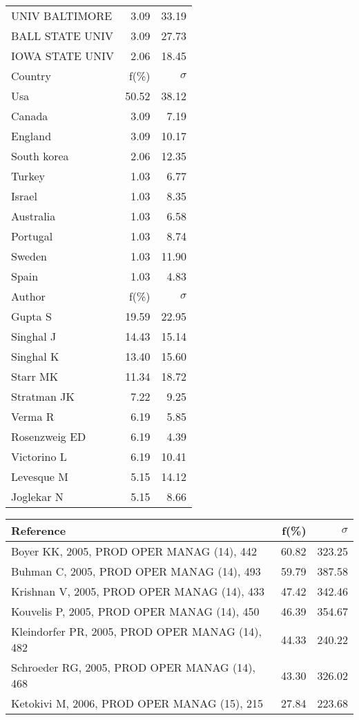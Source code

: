 \documentclass[a4paper,11pt]{report}
\begin{document}
\begin{landscape}
\begin{table}[!ht]
{\begin{tabular}{|l r r|}
UNIV BALTIMORE & 3.09 & 33.19\\
BALL STATE UNIV & 3.09 & 27.73\\
IOWA STATE UNIV & 2.06 & 18.45\\
\hline
\hline
Country & f(\%) & $\sigma$\\
\hline
Usa & 50.52 & 38.12\\
Canada & 3.09 & 7.19\\
England & 3.09 & 10.17\\
South korea & 2.06 & 12.35\\
Turkey & 1.03 & 6.77\\
Israel & 1.03 & 8.35\\
Australia & 1.03 & 6.58\\
Portugal & 1.03 & 8.74\\
Sweden & 1.03 & 11.90\\
Spain & 1.03 & 4.83\\
\hline
\hline
Author & f(\%) & $\sigma$\\
\hline
Gupta S & 19.59 & 22.95\\
Singhal J & 14.43 & 15.14\\
Singhal K & 13.40 & 15.60\\
Starr MK & 11.34 & 18.72\\
Stratman JK & 7.22 & 9.25\\
Verma R & 6.19 & 5.85\\
Rosenzweig ED & 6.19 & 4.39\\
Victorino L & 6.19 & 10.41\\
Levesque M & 5.15 & 14.12\\
Joglekar N & 5.15 & 8.66\\
\hline
\end{tabular}
}
{\scriptsize\begin{tabular}{|l r r|}
\hline
Reference & f(\%) & $\sigma$\\
\hline
Boyer KK, 2005, PROD OPER MANAG (14), 442 & 60.82 & 323.25\\
Buhman C, 2005, PROD OPER MANAG (14), 493 & 59.79 & 387.58\\
Krishnan V, 2005, PROD OPER MANAG (14), 433 & 47.42 & 342.46\\
Kouvelis P, 2005, PROD OPER MANAG (14), 450 & 46.39 & 354.67\\
Kleindorfer PR, 2005, PROD OPER MANAG (14), 482 & 44.33 & 240.22\\
Schroeder RG, 2005, PROD OPER MANAG (14), 468 & 43.30 & 326.02\\
Ketokivi M, 2006, PROD OPER MANAG (15), 215 & 27.84 & 223.68\\

\end{tabular}}
\end{table}
\end{landscape}
\end{document}
